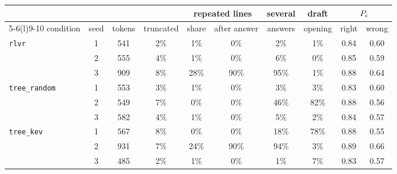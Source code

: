 \begin{tabular}{@{}lccccccccc@{}}
\toprule
 & & & & \multicolumn{2}{c}{repeated lines} & several & draft & \multicolumn{2}{c}{\kev{} $P_{\mathrm{c}}$} \\ \cmidrule(lr){5-6}\cmidrule(l){9-10}
condition & seed & tokens & truncated & share & after answer & answers & opening & right & wrong \\ \midrule
\texttt{rlvr} & 1 & 541 & 2\% & 1\% & 0\% & 2\% & 1\% & 0.84 & 0.60 \\
 & 2 & 555 & 4\% & 1\% & 0\% & 6\% & 0\% & 0.85 & 0.59 \\
 & 3 & 909 & 8\% & 28\% & 90\% & 95\% & 1\% & 0.88 & 0.64 \\
\addlinespace
\texttt{tree\_random} & 1 & 553 & 3\% & 1\% & 0\% & 3\% & 3\% & 0.83 & 0.60 \\
 & 2 & 549 & 7\% & 0\% & 0\% & 46\% & 82\% & 0.88 & 0.56 \\
 & 3 & 582 & 4\% & 1\% & 0\% & 5\% & 2\% & 0.84 & 0.57 \\
\addlinespace
\texttt{tree\_kev} & 1 & 567 & 8\% & 0\% & 0\% & 18\% & 78\% & 0.88 & 0.55 \\
 & 2 & 931 & 7\% & 24\% & 90\% & 94\% & 3\% & 0.89 & 0.66 \\
 & 3 & 485 & 2\% & 1\% & 0\% & 1\% & 7\% & 0.83 & 0.57 \\
\bottomrule
\end{tabular}
